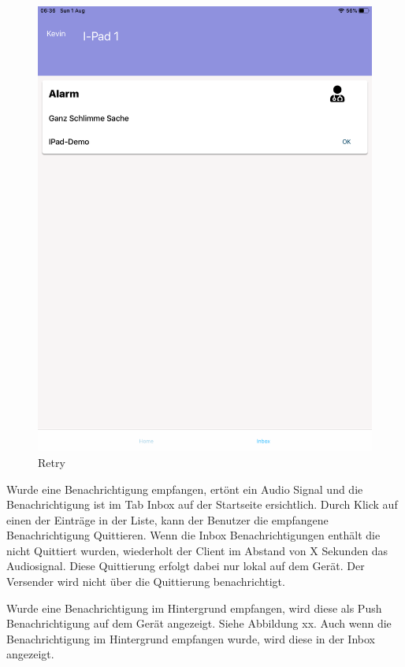\begin{figure}[h]
\begin{minipage}[b]{0.4\textwidth}
        \includegraphics[width=\textwidth]{graphics/screenshots/mobileclient/screenshots-inbox}
        \caption{Retry}
    \end{minipage}
    \label{fig:MobileClient-Screens2}
\end{figure}

\clearpage

Wurde eine Benachrichtigung empfangen, ertönt ein Audio Signal und die Benachrichtigung ist im Tab Inbox auf der Startseite ersichtlich.
Durch Klick auf einen der Einträge in der Liste, kann der Benutzer die empfangene Benachrichtigung Quittieren.
Wenn die Inbox Benachrichtigungen enthält die nicht Quittiert wurden, wiederholt der Client im Abstand von X Sekunden das Audiosignal.
Diese Quittierung erfolgt dabei nur lokal auf dem Gerät.
Der Versender wird nicht über die Quittierung benachrichtigt.

Wurde eine Benachrichtigung im Hintergrund empfangen, wird diese als Push Benachrichtigung auf dem Gerät angezeigt.
Siehe Abbildung xx.
Auch wenn die Benachrichtigung im Hintergrund empfangen wurde, wird diese in der Inbox angezeigt.

